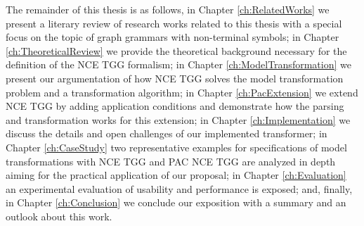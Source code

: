 The remainder of this thesis is as follows, in Chapter \ref{ch:RelatedWorks} we present a literary review of research works related to this thesis with a special focus on the topic of graph grammars with non-terminal symbols; in Chapter \ref{ch:TheoreticalReview} we provide the theoretical background necessary for the definition of the NCE TGG formalism; in Chapter \ref{ch:ModelTransformation} we present our argumentation of how NCE TGG solves the model transformation problem and a transformation algorithm; in Chapter \ref{ch:PacExtension} we extend NCE TGG by adding application conditions and demonstrate how the parsing and transformation works for this extension; in Chapter \ref{ch:Implementation} we discuss the details and open challenges of our implemented transformer; in Chapter \ref{ch:CaseStudy} two representative examples for specifications of model transformations with NCE TGG and PAC NCE TGG are analyzed in depth aiming for the practical application of our proposal; in Chapter \ref{ch:Evaluation} an experimental evaluation of usability and performance is exposed; and, finally, in Chapter \ref{ch:Conclusion} we conclude our exposition with a summary and an outlook about this work.
